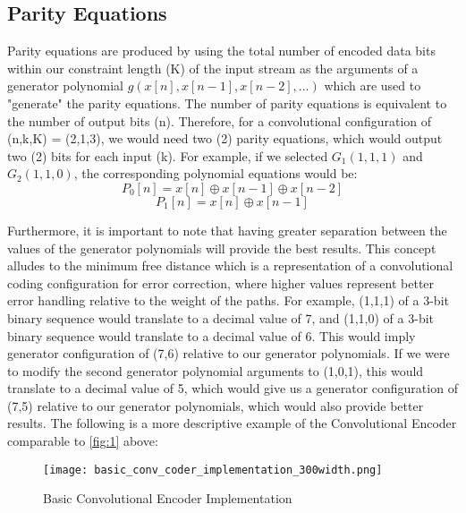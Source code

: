 \documentclass[conference]{IEEEtran}
\begin{document}
\subsection{Parity Equations}
Parity equations are produced by using the total number of encoded data bits within our constraint length (K) of the input stream as the arguments of a generator polynomial $g(x[n], x[n-1], x[n-2], ...)$ which are used to "generate" the parity equations. The number of parity equations is equivalent to the number of output bits (n). Therefore, for a convolutional configuration of (n,k,K) = (2,1,3), we would need two (2) parity equations, which would output two (2) bits for each input (k). For example, if we selected $G_1(1,1,1)$ and $G_2(1,1,0)$, the corresponding polynomial equations would be:
\begin{equation*}
    P_0[n] = x[n] \oplus x[n-1] \oplus x[n-2]
\end{equation*}
\begin{equation*}
    P_1[n] = x[n] \oplus x[n-1]
\end{equation*}

Furthermore, it is important to note that having greater separation between the values of the generator polynomials will provide the best results. This concept alludes to the minimum free distance which is a representation of a convolutional coding configuration for error correction, where higher values represent better error handling relative to the weight of the paths. For example, (1,1,1) of a 3-bit binary sequence would translate to a decimal value of 7, and (1,1,0) of a 3-bit binary sequence would translate to a decimal value of 6. This would imply generator configuration of (7,6) relative to our generator polynomials. If we were to modify the second generator polynomial arguments to (1,0,1), this would translate to a decimal value of 5, which would give us a generator configuration of (7,5) relative to our generator polynomials, which would also provide better results. The following is a more descriptive example of the Convolutional Encoder \cite{b3} comparable to \ref{fig:1} above:
\begin{figure}[h]
\centerline{\texttt{[image: basic\_conv\_coder\_implementation\_300width.png]}}
\caption{Basic Convolutional Encoder Implementation}
\label{fig:2}
\end{figure}
\end{document}
